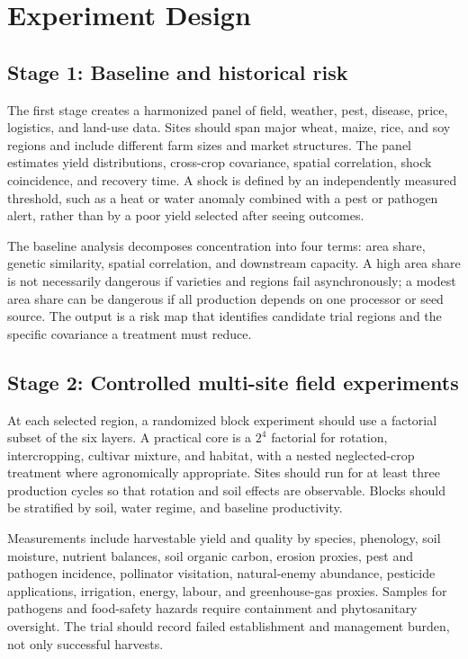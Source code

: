 \documentclass[conference]{IEEEtran}
\begin{document}
\section{Experiment Design}
\label{sec:design}
\subsection{Stage 1: Baseline and historical risk}
The first stage creates a harmonized panel of field, weather, pest, disease, price, logistics, and land-use data. Sites should span major wheat, maize, rice, and soy regions and include different farm sizes and market structures. The panel estimates yield distributions, cross-crop covariance, spatial correlation, shock coincidence, and recovery time. A shock is defined by an independently measured threshold, such as a heat or water anomaly combined with a pest or pathogen alert, rather than by a poor yield selected after seeing outcomes.

The baseline analysis decomposes concentration into four terms: area share, genetic similarity, spatial correlation, and downstream capacity. A high area share is not necessarily dangerous if varieties and regions fail asynchronously; a modest area share can be dangerous if all production depends on one processor or seed source. The output is a risk map that identifies candidate trial regions and the specific covariance a treatment must reduce.

\subsection{Stage 2: Controlled multi-site field experiments}
At each selected region, a randomized block experiment should use a factorial subset of the six layers. A practical core is a $2^4$ factorial for rotation, intercropping, cultivar mixture, and habitat, with a nested neglected-crop treatment where agronomically appropriate. Sites should run for at least three production cycles so that rotation and soil effects are observable. Blocks should be stratified by soil, water regime, and baseline productivity.

Measurements include harvestable yield and quality by species, phenology, soil moisture, nutrient balances, soil organic carbon, erosion proxies, pest and pathogen incidence, pollinator visitation, natural-enemy abundance, pesticide applications, irrigation, energy, labour, and greenhouse-gas proxies. Samples for pathogens and food-safety hazards require containment and phytosanitary oversight. The trial should record failed establishment and management burden, not only successful harvests.
\end{document}
